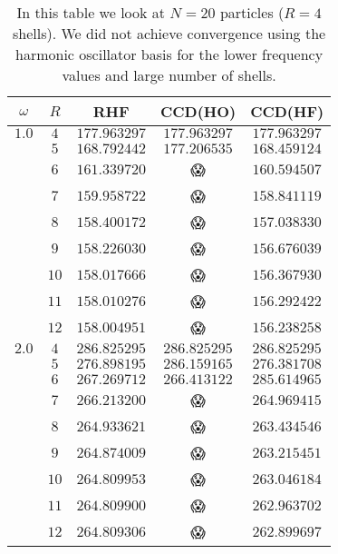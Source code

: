 \documentclass[
    a4paper, aps, twocolumn, floatfix, superscriptaddress,
    nofootinbib]{revtex4-1}
\newcommand{\nan}{\DejaSans 😱}
\newcommand{\1}{\mathds{1}}
\begin{document}
    \begin{table}
        \centering
        \caption{In this table we look at $N = 20$ particles ($R = 4$ shells).
        We did not achieve convergence using the harmonic oscillator basis for
        the lower frequency values and large number of shells.}
        \begin{ruledtabular}
            \begin{tabular}{c|c|ccc}
                $\omega$ & $R$ & RHF & CCD(HO) & CCD(HF) \\
                \hline
                $1.0$ & $4$ & $177.963297$ & $177.963297$ & $177.963297$ \\
                      & $5$ & $168.792442$ & $177.206535$ & $168.459124$ \\
                      & $6$ & $161.339720$ & \nan & $160.594507$ \\
                      & $7$ & $159.958722$ & \nan & $158.841119$ \\
                      & $8$ & $158.400172$ & \nan & $157.038330$ \\
                      & $9$ & $158.226030$ & \nan & $156.676039$ \\
                      & $10$ & $158.017666$ & \nan & $156.367930$ \\
                      & $11$ & $158.010276$ & \nan & $156.292422$ \\
                      & $12$ & $158.004951$ & \nan & $156.238258$ \\
                \hline
                $2.0$ & $4$ & $286.825295$ & $286.825295$ & $286.825295$ \\
                      & $5$ & $276.898195$ & $286.159165$ & $276.381708$ \\
                      & $6$ & $267.269712$ & $266.413122$ & $285.614965$ \\
                      & $7$ & $266.213200$ & \nan & $264.969415$ \\
                      & $8$ & $264.933621$ & \nan & $263.434546$ \\
                      & $9$ & $264.874009$ & \nan & $263.215451$ \\
                      & $10$ & $264.809953$ & \nan & $263.046184$ \\
                      & $11$ & $264.809900$ & \nan & $262.963702$ \\
                      & $12$ & $264.809306$ & \nan & $262.899697$ \\
                \hline

\end{tabular}
\end{ruledtabular}
\end{table}
\end{document}
